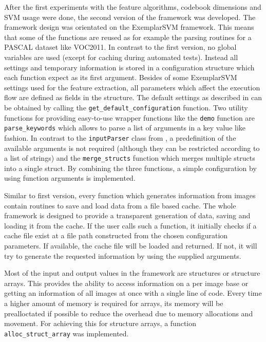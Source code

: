 After the first experiments with the feature algorithms, codebook dimensions and \ac{SVM} usage were done, the second version of the framework was developed. The framework design was orientated on the ExemplarSVM framework. This means that some of the functions are reused as for example the parsing routines for a PASCAL dataset like \ac{VOC2011}. In contrast to the first version, no global variables are used (except for caching during automated tests). Instead all settings and temporary information is stored in a configuration structure which each function expect as its first argument. Besides of some ExemplarSVM settings used for the feature extraction, all parameters which affect the execution flow are defined as fields in the structure. The default settings as described in  can be obtained by calling the \verb|get_default_configuration| function. Two utility functions for providing easy-to-use wrapper functions like the \verb|demo| function are \verb|parse_keywords| which allows to parse a list of arguments in a key value like fashion. In contrast to the \verb|inputParser| class from \MATLAB, a predefinition of the available arguments is not required (although they can be restricted according to a list of strings) and the \verb|merge_structs| function which merges multiple structs into a single struct. By combining the three functions, a simple configuration by using function arguments is implemented.

Similar to first version, every function which generates information from images contain routines to save and load data from a file based cache. The whole framework is designed to provide a transparent generation of data, saving and loading it from the cache. If the user calls such a function, it initially checks if a cache file exist at a file path constructed from the chosen configuration parameters. If available, the cache file will be loaded and returned. If not, it will try to generate the requested information by using the supplied arguments.


Most of the input and output values in the framework are structures or structure arrays. This provides the ability to access information on a per image base or getting an information of all images at once with a single line of code. Every time a higher amount of memory is required for arrays, its memory will be prealloctated if possible to reduce the overhead due to memory allocations and movement. For achieving this for structure arrays, a function \verb|alloc_struct_array| was implemented.

